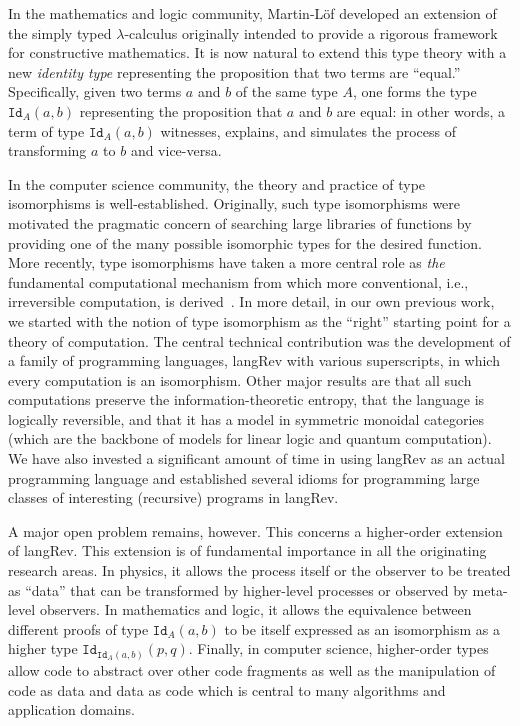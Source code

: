 \documentclass{llncs}
\begin{document}
In the mathematics and logic community, Martin-L\"of developed an extension
of the simply typed $\lambda$-calculus originally intended to provide a
rigorous framework for constructive mathematics. It is now natural to extend
this type theory with a new \emph{identity type} representing the proposition
that two terms are ``equal.'' Specifically, given two terms $a$ and $b$ of
the same type $A$, one forms the type $\texttt{Id}_A(a,b)$ representing the
proposition that $a$ and $b$ are equal: in other words, a term of type
$\texttt{Id}_A(a,b)$ witnesses, explains, and simulates the process of
transforming $a$ to $b$ and vice-versa.

In the computer science community, the theory and practice of type
isomorphisms is well-established. Originally, such type isomorphisms were
motivated the pragmatic concern of searching large libraries of functions by
providing one of the many possible isomorphic types for the desired
function. More recently, type isomorphisms have taken a more central role as
\emph{the} fundamental computational mechanism from which more conventional,
i.e., irreversible computation, is derived~\cite{infeffects}. In more detail,
in our own previous work, we started with the notion of type isomorphism as
the ``right'' starting point for a theory of computation. The central
technical contribution was the development of a family of programming
languages, {{langRev}} with various superscripts, in which every computation
is an isomorphism. Other major results are that all such computations
preserve the information-theoretic entropy, that the language is logically
reversible, and that it has a model in symmetric monoidal categories (which
are the backbone of models for linear logic and quantum computation). We have
also invested a significant amount of time in using {{langRev}} as an actual
programming language and established several idioms for programming large
classes of interesting (recursive) programs in {{langRev}}. 

A major open problem remains, however. This concerns a higher-order extension
of {{langRev}}. This extension is of fundamental importance in all the
originating research areas. In physics, it allows the process itself or the
observer to be treated as ``data'' that can be transformed by higher-level
processes or observed by meta-level observers. In mathematics and logic, it
allows the equivalence between different proofs of type $\texttt{Id}_A(a,b)$
to be itself expressed as an isomorphism as a higher type
$\texttt{Id}_{\texttt{Id}_A(a,b)}(p,q)$. Finally, in computer science,
higher-order types allow code to abstract over other code fragments as well
as the manipulation of code as data and data as code which is central to many
algorithms and application domains.
\end{document}
